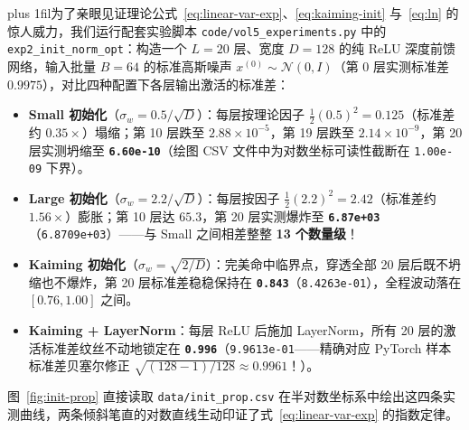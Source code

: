{\rightskip=0pt plus 1fil\relax 为了亲眼见证理论公式~\eqref{eq:linear-var-exp}、\eqref{eq:kaiming-init} 与~\eqref{eq:ln} 的惊人威力，我们运行配套实验脚本 \texttt{code/vol5\_experiments.py} 中的 \texttt{exp2\_init\_norm\_opt}：构造一个 $L = 20$ 层、宽度 $D = 128$ 的纯 ReLU 深度前馈网络，输入批量 $B = 64$ 的标准高斯噪声 $x^{(0)} \sim \mathcal{N}(0, I)$（第 0 层实测标准差 $0.9975$），对比四种配置下各层输出激活的标准差：\par}
\begin{itemize}
  \item \textbf{Small 初始化}（$\sigma_w = 0.5 / \sqrt{D}$）：每层按理论因子 $\frac{1}{2}(0.5)^2 = 0.125$（标准差约 $0.35\times$）塌缩；第 10 层跌至 $2.88 \times 10^{-5}$，第 19 层跌至 $2.14 \times 10^{-9}$，第 20 层实测坍缩至 \textbf{\texttt{6.60e-10}}（绘图 CSV 文件中为对数坐标可读性截断在 \texttt{1.00e-09} 下界）。
  \item \textbf{Large 初始化}（$\sigma_w = 2.2 / \sqrt{D}$）：每层按因子 $\frac{1}{2}(2.2)^2 = 2.42$（标准差约 $1.56\times$）膨胀；第 10 层达 $65.3$，第 20 层实测爆炸至 \textbf{\texttt{6.87e+03}}（\texttt{6.8709e+03}）——与 Small 之间相差整整 \textbf{13 个数量级}！
  \item \textbf{Kaiming 初始化}（$\sigma_w = \sqrt{2/D}$）：完美命中临界点，穿透全部 20 层后既不坍缩也不爆炸，第 20 层标准差稳稳保持在 \textbf{\texttt{0.843}}（\texttt{8.4263e-01}），全程波动落在 $[0.76, 1.00]$ 之间。
  \item \textbf{Kaiming + LayerNorm}：每层 ReLU 后施加 LayerNorm，所有 20 层的激活标准差纹丝不动地锁定在 \textbf{\texttt{0.996}}（\texttt{9.9613e-01}——精确对应 PyTorch 样本标准差贝塞尔修正 $\sqrt{(128-1)/128} \approx 0.9961$！）。
\end{itemize}

图~\ref{fig:init-prop} 直接读取 \texttt{data/init\_prop.csv} 在半对数坐标系中绘出这四条实测曲线，两条倾斜笔直的对数直线生动印证了式~\eqref{eq:linear-var-exp} 的指数定律。


